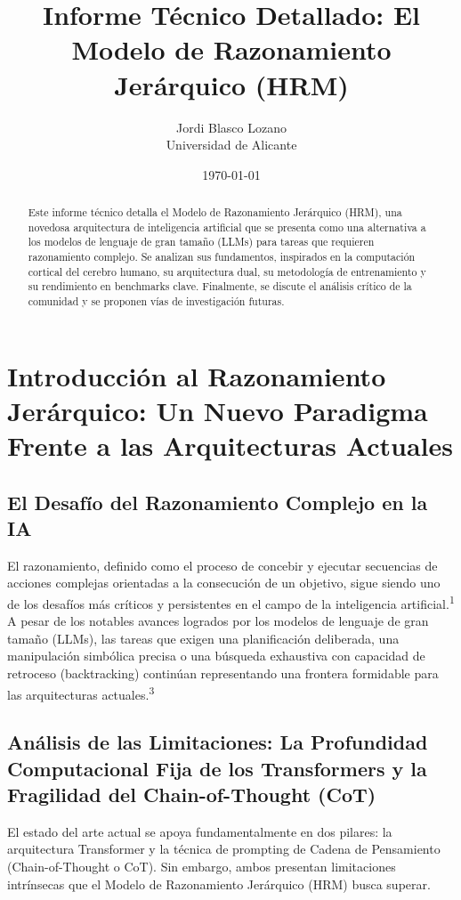 \documentclass{article}
\title{Informe Técnico Detallado: El Modelo de Razonamiento Jerárquico (HRM)}
\author{
	Jordi Blasco Lozano \\
	\small Universidad de Alicante
}
\date{\today}
\begin{document}
	
	\maketitle
	
	\begin{abstract}
		\noindent Este informe técnico detalla el Modelo de Razonamiento Jerárquico (HRM), una novedosa arquitectura de inteligencia artificial que se presenta como una alternativa a los modelos de lenguaje de gran tamaño (LLMs) para tareas que requieren razonamiento complejo. Se analizan sus fundamentos, inspirados en la computación cortical del cerebro humano, su arquitectura dual, su metodología de entrenamiento y su rendimiento en benchmarks clave. Finalmente, se discute el análisis crítico de la comunidad y se proponen vías de investigación futuras.
	\end{abstract}
	
	\tableofcontents
	\newpage
	
	\section{Introducción al Razonamiento Jerárquico: Un Nuevo Paradigma Frente a las Arquitecturas Actuales}
	
	\subsection{El Desafío del Razonamiento Complejo en la IA}
	El razonamiento, definido como el proceso de concebir y ejecutar secuencias de acciones complejas orientadas a la consecución de un objetivo, sigue siendo uno de los desafíos más críticos y persistentes en el campo de la inteligencia artificial.\textsuperscript{1} A pesar de los notables avances logrados por los modelos de lenguaje de gran tamaño (LLMs), las tareas que exigen una planificación deliberada, una manipulación simbólica precisa o una búsqueda exhaustiva con capacidad de retroceso (backtracking) continúan representando una frontera formidable para las arquitecturas actuales.\textsuperscript{3}
	
	\subsection{Análisis de las Limitaciones: La Profundidad Computacional Fija de los Transformers y la Fragilidad del Chain-of-Thought (CoT)}
	El estado del arte actual se apoya fundamentalmente en dos pilares: la arquitectura Transformer y la técnica de prompting de Cadena de Pensamiento (Chain-of-Thought o CoT). Sin embargo, ambos presentan limitaciones intrínsecas que el Modelo de Razonamiento Jerárquico (HRM) busca superar.
	
\end{document}
